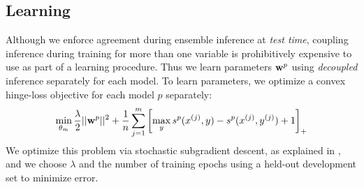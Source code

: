 \subsection{Learning} Although we enforce agreement during ensemble inference 
at {\em test time}, coupling inference during training for more than one 
variable is prohibitively expensive to use as part of a learning procedure.  
Thus we learn
parameters $\mathbf{w}^p$ using {\em decoupled} inference separately for
each model. To learn parameters, we optimize a convex hinge-loss
objective for each model $p$ separately:
 \begin{align}
\min_{\theta_m} \frac{\lambda}{2}||\mathbf{w}^p||^2 +
\frac{1}{n}\sum_{j=1}^m \left[ \max_y s^p(x^{(j)},y) - s^p(x^{(j)},y^{(j)})
+1\right]_+
\end{align}
We optimize this problem via stochastic subgradient descent, as explained in 
, and we choose
$\lambda$ and the number of training epochs using a held-out
development set to minimize error.



